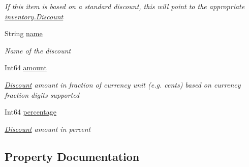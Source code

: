 \begin{DoxyCompactItemize}
\begin{DoxyCompactList}\small\item\em If this item is based on a standard discount, this will point to the appropriate \hyperlink{classcom_1_1clover_1_1sdk_1_1v3_1_1inventory_1_1_discount}{inventory.\+Discount} \end{DoxyCompactList}\item 
String \hyperlink{classcom_1_1clover_1_1sdk_1_1v3_1_1order_1_1_discount_ac69ca30b6c9d052de6ce2354a8fab7c1}{name}
\begin{DoxyCompactList}\small\item\em Name of the discount \end{DoxyCompactList}\item 
Int64 \hyperlink{classcom_1_1clover_1_1sdk_1_1v3_1_1order_1_1_discount_af6d8f69255c4881156507cca3d4fd200}{amount}
\begin{DoxyCompactList}\small\item\em \hyperlink{classcom_1_1clover_1_1sdk_1_1v3_1_1order_1_1_discount}{Discount} amount in fraction of currency unit (e.\+g. cents) based on currency fraction digits supported \end{DoxyCompactList}\item 
Int64 \hyperlink{classcom_1_1clover_1_1sdk_1_1v3_1_1order_1_1_discount_a060312534890beb01ad9cc302ecc141f}{percentage}
\begin{DoxyCompactList}\small\item\em \hyperlink{classcom_1_1clover_1_1sdk_1_1v3_1_1order_1_1_discount}{Discount} amount in percent \end{DoxyCompactList}\end{DoxyCompactItemize}


\subsection{Property Documentation}
\mbox{\label{classcom_1_1clover_1_1sdk_1_1v3_1_1order_1_1_discount_af6d8f69255c4881156507cca3d4fd200}} 
